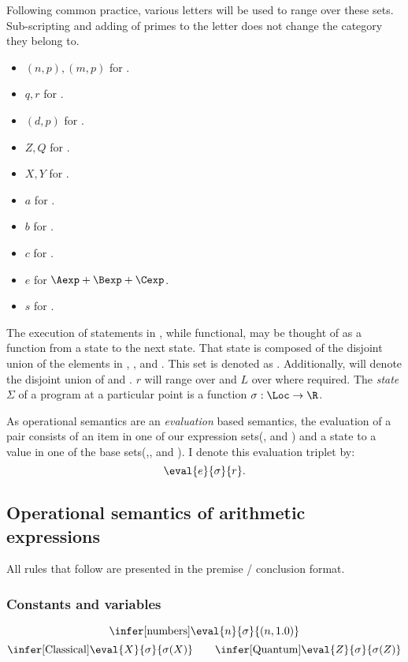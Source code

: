 Following common practice, various letters will be used to range over these
sets. Sub-scripting and adding of primes to the letter does not change the 
category they belong to.
\begin{itemize}
\item{} $(n,p),(m,p)$ for \n.
\item{} $q,r$ for \Q.
\item{} $(d,p)$ for \Data.
\item{} $Z,Q$ for \Qloc.
\item{} $X,Y$ for \Cloc.
\item{} $a$ for \Aexp.
\item{} $b$ for \Bexp.
\item{} $c$ for \Cexp.
\item{} $e$ for $\Aexp + \Bexp + \Cexp$.
\item{} $s$ for \Stm.
\end{itemize}

The execution of statements in \lqpl, while functional, may be thought of
as a function from a state to the next state. That state is composed of the
disjoint 
union of the elements in \n, \T, \Q{} and \Data. This set is denoted as 
\R. Additionally, \Loc{} will denote the disjoint union of 
\Cloc{} and \Qloc{}. $r$ will range over \R{} and $L$ over \Loc{} 
where required.
The \emph{state} $\Sigma$ of a 
program at a particular point is a function
 $\sigma: \Loc \to\R$.

As operational semantics are an \emph{evaluation} based semantics,
the evaluation of a pair consists of an item in one of our 
expression sets(\Aexp, \Bexp{} and \Cexp)
 and a state to a value in one of the base sets(\n,\T, \Q{} and \Data).
I denote this evaluation triplet by:
\[\eval{e}{\sigma}{r}.\]

\subsection{Operational semantics of arithmetic expressions}\label{subsec:oparithmetic}
All rules that follow are presented in the premise / conclusion format.
\subsubsection{Constants and variables}
\[\infer[\mathrm{numbers}]{\eval{n}{\sigma}{(n,1.0)}}{}\]
\[
\infer[\mathrm{Classical}]{\eval{X}{\sigma}{\sigma(X)}}{}
\qquad
\infer[\mathrm{Quantum}]{\eval{Z}{\sigma}{\sigma(Z)}}{}
\]
